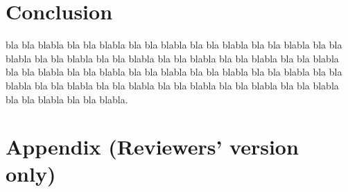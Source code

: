 \documentclass[a4paper,10pt]{llncs}
\begin{document}
\bigskip
\bigskip


\section{Conclusion}
\label{section:Conclusion}

bla bla blabla bla bla blabla bla bla blabla bla bla blabla bla bla blabla
bla bla blabla bla bla blabla bla bla blabla bla bla blabla bla bla blabla
bla bla blabla bla bla blabla bla bla blabla bla bla blabla bla bla blabla
bla bla blabla bla bla blabla bla bla blabla bla bla blabla bla bla blabla
bla bla blabla bla bla blabla bla bla blabla bla bla blabla.







\newpage
\section*{Appendix (Reviewers' version only)}


\end{document}
